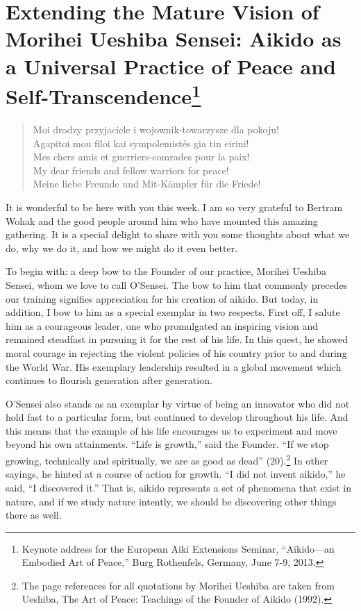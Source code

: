 \chapter[Extending the Mature Vision of Morihei Ueshiba Sensei (2013)]{Extending the Mature Vision of Morihei Ueshiba Sensei: Aikido as a Universal Practice of Peace and Self-Transcendence\footnote{Keynote address for the European Aiki Extensions Seminar, ``Aikido---an Embodied Art 
of Peace,'' Burg Rothenfels, Germany, June 7-9, 2013.}}

\begin{verse}
Moi drodzy przyjaciele i wojownik-towarzysze dla pokoju! \\
Agapitoi mou filoi kai sympolemist\'{e}s gia tin eirini! \\
Mes chers amis et guerriers-comrades pour la paix! \\
My dear friends and fellow warriors for peace! \\
Meine liebe Freunde und Mit-K\"{a}mpfer f\"{u}r die Friede!
\end{verse}

It is wonderful to be here with you this week. I am so very grateful to Bertram Wohak and the good people around him who have mounted this amazing gathering. It is a special delight to share with you some thoughts about what we do, why we do it, and how we might do it even better.

To begin with: a deep bow to the Founder of our practice, Morihei Ueshiba Sensei, whom we love to call O'Sensei. The bow to him that commonly precedes our training signifies appreciation for his creation of aikido. But today, in addition, I bow to him as a special exemplar in two respects. First off, I salute him as a courageous leader, one who promulgated an inspiring vision and remained steadfast in pursuing it for the rest of his life. In this quest, he showed moral courage in rejecting the violent policies of his country prior to and during the World War. His exemplary leadership resulted in a global movement which continues to flourish generation after generation.

O'Sensei also stands as an exemplar by virtue of being an innovator who did not hold fast to a particular form, but continued to develop throughout his life. And this means that the example of his life encourages us to experiment and move beyond his own attainments. ``Life is growth,'' said the Founder. ``If we stop growing, technically and spiritually, we are as good as dead'' (20).\footnote{The page references for all quotations by Morihei Ueshiba are taken from Ueshiba, The Art of Peace: Teachings of the Founder of Aikido (1992).} In other sayings, he hinted at a course of action for growth. ``I did not invent aikido,'' he said, ``I discovered it.'' That is, aikido represents a set of phenomena that exist in nature, and if we study nature intently, we should be discovering other things there as well. 

